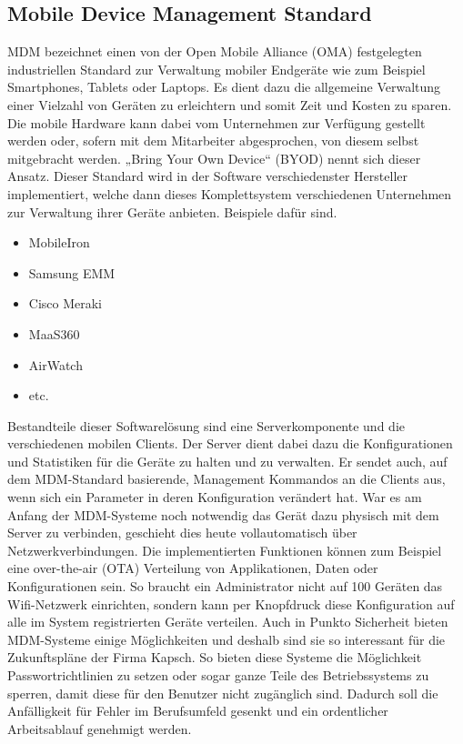 \subsection{Mobile Device Management Standard}
MDM bezeichnet einen von der Open Mobile Alliance (OMA) festgelegten industriellen Standard zur Verwaltung mobiler Endgeräte wie zum Beispiel Smartphones, Tablets oder Laptops. Es dient dazu die allgemeine Verwaltung einer Vielzahl von Geräten zu erleichtern und somit Zeit und Kosten zu sparen. Die mobile Hardware kann dabei vom Unternehmen zur Verfügung gestellt werden oder, sofern mit dem Mitarbeiter abgesprochen, von diesem selbst mitgebracht werden. „Bring Your Own Device“ (BYOD) nennt sich dieser Ansatz. Dieser Standard wird in der Software verschiedenster Hersteller implementiert, welche dann dieses Komplettsystem verschiedenen Unternehmen zur Verwaltung ihrer Geräte anbieten. Beispiele dafür sind.
\begin{itemize}
	\item MobileIron
	\item Samsung EMM
	\item Cisco Meraki
	\item MaaS360
	\item AirWatch
	\item etc.
\end{itemize}
Bestandteile dieser Softwarelösung sind eine Serverkomponente und die verschiedenen mobilen Clients. Der Server dient dabei dazu die Konfigurationen und Statistiken für die Geräte zu halten und zu verwalten. Er sendet auch, auf dem MDM-Standard basierende, Management Kommandos an die Clients aus, wenn sich ein Parameter in deren Konfiguration verändert hat. War es am Anfang der MDM-Systeme noch notwendig das Gerät dazu physisch mit dem Server zu verbinden, geschieht dies heute vollautomatisch über Netzwerkverbindungen. Die implementierten Funktionen können zum Beispiel eine over-the-air (OTA) Verteilung von Applikationen, Daten oder Konfigurationen sein. So braucht ein Administrator nicht auf 100 Geräten das Wifi-Netzwerk einrichten, sondern kann per Knopfdruck diese Konfiguration auf alle im System registrierten Geräte verteilen.  Auch in Punkto Sicherheit bieten MDM-Systeme einige Möglichkeiten und deshalb sind sie so interessant für die Zukunftspläne der Firma Kapsch. So bieten diese Systeme die Möglichkeit Passwortrichtlinien zu setzen oder sogar ganze Teile des Betriebssystems zu sperren, damit diese für den Benutzer nicht zugänglich sind. Dadurch soll die Anfälligkeit für Fehler im Berufsumfeld gesenkt und ein ordentlicher Arbeitsablauf genehmigt werden.
